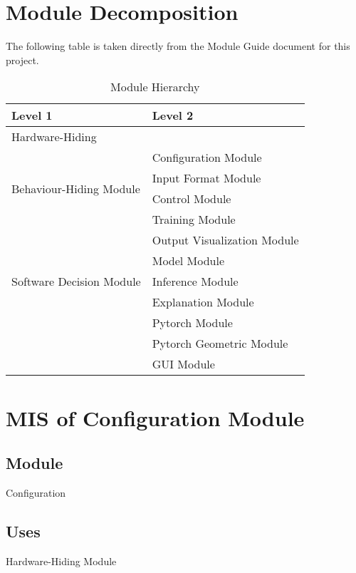 \documentclass[12pt, titlepage]{article}
\begin{document}
\section{Module Decomposition}

The following table is taken directly from the Module Guide document for this project.

\begin{table}[h!]
\centering
\begin{tabular}{p{} p{}}
\toprule
\textbf{Level 1} & \textbf{Level 2}\\
\midrule

{Hardware-Hiding} & ~ \\
\midrule

\multirow{4}{0.3\textwidth}{Behaviour-Hiding Module} & Configuration Module \\
& Input Format Module\\
& Control Module\\
& Training Module\\
& Output Visualization Module\\
\midrule

\multirow{3}{0.3\textwidth}{Software Decision Module} & {Model Module}\\
& Inference Module\\
& Explanation Module\\
& Pytorch Module\\
& Pytorch Geometric Module\\
& GUI Module\\
\bottomrule

\end{tabular}
\caption{Module Hierarchy}
\label{TblMH}
\end{table}



\section{MIS of Configuration Module} \label{Configurations}

\subsection{Module}
Configuration

\subsection{Uses}
Hardware-Hiding Module
\end{document}
